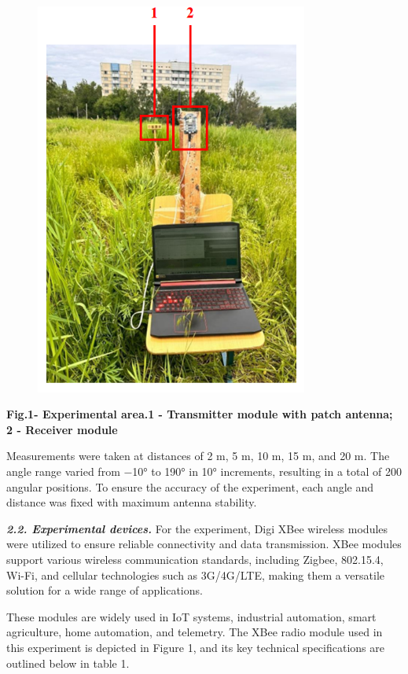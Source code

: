 \begin{figure}[H]
	\centering
	\includegraphics[width=0.8\textwidth]{media/ict/image41}
	\caption*{}
\end{figure}


{\bfseries Fig.1- Experimental area.1 - Transmitter module with patch
antenna; 2 - Receiver module}

Measurements were taken at distances of 2 m, 5 m, 10 m, 15 m, and 20 m.
The angle range varied from −10° to 190° in 10° increments, resulting in
a total of 200 angular positions. To ensure the accuracy of the
experiment, each angle and distance was fixed with maximum antenna
stability.

\emph{{\bfseries 2.2. Experimental devices.}} For the experiment, Digi XBee
wireless modules were utilized to ensure reliable connectivity and data
transmission. XBee modules support various wireless communication
standards, including Zigbee, 802.15.4, Wi-Fi, and cellular technologies
such as 3G/4G/LTE, making them a versatile solution for a wide range of
applications.

These modules are widely used in IoT systems, industrial automation,
smart agriculture, home automation, and telemetry. The XBee radio module
used in this experiment is depicted in Figure 1, and its key technical
specifications are outlined below in table 1.

